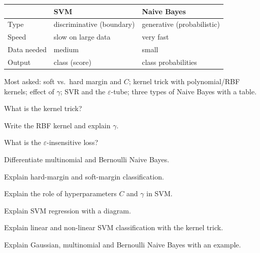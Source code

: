 \begin{center}
\small
\begin{tabular}{@{}p{3.0cm}p{6.6cm}p{6.6cm}@{}}
\toprule
 & \textbf{SVM} & \textbf{Naive Bayes}\\
\midrule
Type & discriminative (boundary) & generative (probabilistic)\\
Speed & slow on large data & very fast\\
Data needed & medium & small\\
Output & class (score) & class probabilities\\
\bottomrule
\end{tabular}
\end{center}

\begin{imp}
Most asked: soft vs.\ hard margin and $C$; kernel trick with polynomial/RBF kernels; effect of $\gamma$; SVR and the $\varepsilon$-tube; three types of Naive Bayes with a table.
\end{imp}

\begin{iq}
\item \twom What is the kernel trick?
\item \twom Write the RBF kernel and explain $\gamma$.
\item \twom What is the $\varepsilon$-insensitive loss?
\item \twom Differentiate multinomial and Bernoulli Naive Bayes.
\item \fivem Explain hard-margin and soft-margin classification.
\item \fivem Explain the role of hyperparameters $C$ and $\gamma$ in SVM.
\item \fivem Explain SVM regression with a diagram.
\item \tenm Explain linear and non-linear SVM classification with the kernel trick.
\item \tenm Explain Gaussian, multinomial and Bernoulli Naive Bayes with an example.
\end{iq}
